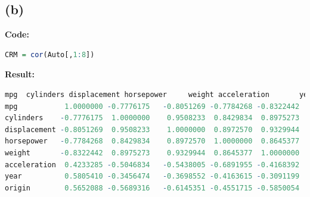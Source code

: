 \documentclass[twoside]{homework}
\begin{document}
\subsection*{(b)}
\textbf{Code:}
\begin{lstlisting}[language=R]
CRM = cor(Auto[,1:8])
\end{lstlisting}
\textbf{Result:}
\begin{lstlisting}[language=R, basicstyle=\tiny]
                    mpg  cylinders displacement horsepower     weight acceleration       year     origin
mpg           1.0000000 -0.7776175   -0.8051269 -0.7784268 -0.8322442    0.4233285  0.5805410  0.5652088
cylinders    -0.7776175  1.0000000    0.9508233  0.8429834  0.8975273   -0.5046834 -0.3456474 -0.5689316
displacement -0.8051269  0.9508233    1.0000000  0.8972570  0.9329944   -0.5438005 -0.3698552 -0.6145351
horsepower   -0.7784268  0.8429834    0.8972570  1.0000000  0.8645377   -0.6891955 -0.4163615 -0.4551715
weight       -0.8322442  0.8975273    0.9329944  0.8645377  1.0000000   -0.4168392 -0.3091199 -0.5850054
acceleration  0.4233285 -0.5046834   -0.5438005 -0.6891955 -0.4168392    1.0000000  0.2903161  0.2127458
year          0.5805410 -0.3456474   -0.3698552 -0.4163615 -0.3091199    0.2903161  1.0000000  0.1815277
origin        0.5652088 -0.5689316   -0.6145351 -0.4551715 -0.5850054    0.2127458  0.1815277  1.0000000
\end{lstlisting}
\end{document}

